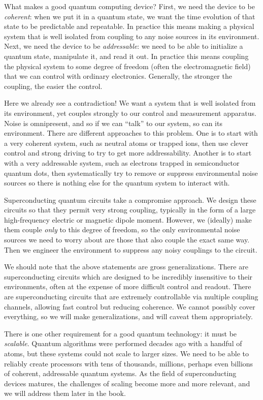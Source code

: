 What makes a good quantum computing device?
First, we need the device to be \textit{coherent}: when we put it in a quantum state, we want the time evolution of that state to be predictable and repeatable.
In practice this means making a physical system that is well isolated from coupling to any noise sources in its environment.
Next, we need the device to be \textit{addressable}: we need to be able to initialize a quantum state, manipulate it, and read it out.
In practice this means coupling the physical system to some degree of freedom (often the electromagnetic field) that we can control with ordinary electronics.
Generally, the stronger the coupling, the easier the control.

Here we already see a contradiction! We want a system that is well isolated from its environment, yet couples strongly to our control and measurement apparatus.
Noise is omnipresent, and so if we can ``talk'' to our system, so can its environment.
There are different approaches to this problem.
One is to start with a very coherent system, such as neutral atoms or trapped ions, then use clever control and strong driving to try to get more addressability.
Another is to start with a very addressable system, such as electrons trapped in semiconductor quantum dots, then systematically try to remove or suppress environmental noise sources so there is nothing else for the quantum system to interact with.

Superconducting quantum circuits take a compromise approach.
We design these circuits so that they permit very strong coupling, typically in the form of a large high-frequency electric or magnetic dipole moment.
However, we (ideally) make them couple \textit{only} to this degree of freedom, so the only environmental noise sources we need to worry about are those that also couple the exact same way.
Then we engineer the environment to suppress any noisy couplings to the circuit.

We should note that the above statements are gross generalizations.
There are superconducting circuits which are designed to be incredibly insensitive to their environments, often at the expense of more difficult control and readout.
There are superconducting circuits that are extremely controllable via multiple coupling channels, allowing fast control but reducing coherence.
We cannot possibly cover everything, so we will make generalizations, and will caveat them appropriately.

There is one other requirement for a good quantum technology: it must be \textit{scalable}.
Quantum algorithms were performed decades ago with a handful of atoms, but these systems could not scale to larger sizes.
We need to be able to reliably create processors with tens of thousands, millions, perhaps even billions of coherent, addressable quantum systems.
As the field of superconducting devices matures, the challenges of scaling become more and more relevant, and we will address them later in the book.

